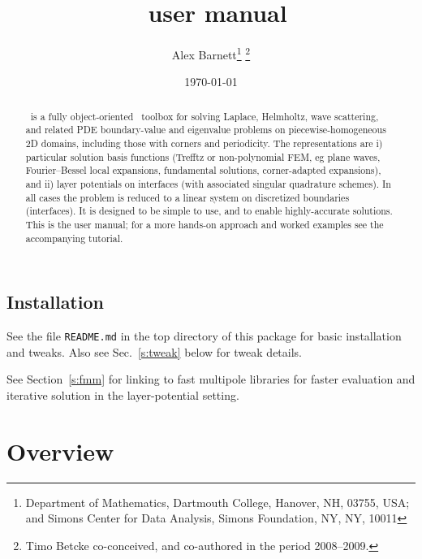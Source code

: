 \documentclass[12pt]{article}
\begin{document}
\title{\mpspack\ user manual}
\author{Alex Barnett\footnote{Department of Mathematics, Dartmouth College, Hanover, NH, 03755, USA; and Simons Center for Data Analysis, Simons Foundation, NY, NY, 10011} \footnote{Timo Betcke co-conceived, and co-authored in the period 2008--2009.}}
\date{\today}

\maketitle
\begin{abstract}
\mpspack\ is a fully object-oriented \matlab\ toolbox for
solving Laplace, Helmholtz, wave scattering, and related PDE boundary-value
and eigenvalue problems
on piecewise-homogeneous 2D domains, including those with corners
and periodicity.
The representations are i) particular solution basis functions (Trefftz or non-polynomial FEM, eg plane waves, Fourier--Bessel local expansions, fundamental solutions, corner-adapted expansions), and ii) layer potentials on interfaces
(with associated singular quadrature schemes).
In all cases the problem is reduced to a linear system on
discretized boundaries (interfaces).
It is designed to
be simple to use, and to enable highly-accurate solutions.  This is
the user manual; for a more hands-on approach and worked examples
see the accompanying tutorial.
\end{abstract}


\bfi %
\efi



\subsection{Installation}

See the file {\tt README.md} in the top directory of this package for
basic installation and tweaks. Also see Sec.~\ref{s:tweak}
below for tweak details.

See Section~\ref{s:fmm} for linking to fast multipole libraries
for faster evaluation and iterative solution in the layer-potential
setting.

\section{Overview}
\label{s:overview}
\end{document}
